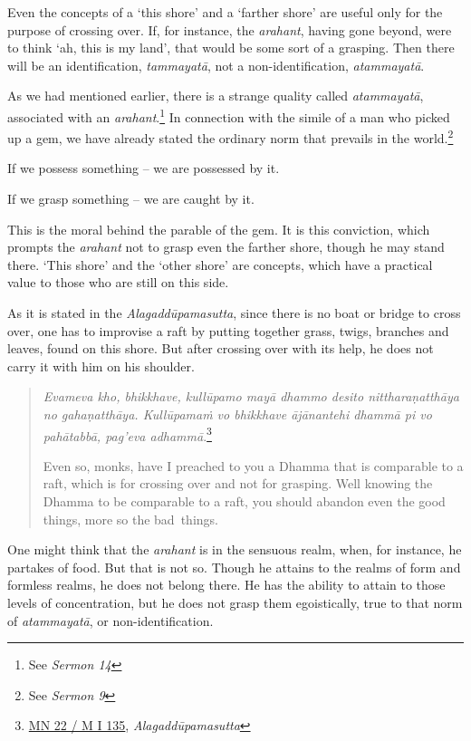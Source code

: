 Even the concepts of a `this shore' and a `farther shore' are useful only for the purpose of crossing over. If, for instance, the \emph{arahant}, having gone beyond, were to think `ah, this is my land', that would be some sort of a grasping. Then there will be an identification, \emph{tammayatā}, not a non-identification, \emph{atammayatā}.

As we had mentioned earlier, there is a strange quality called \emph{atammayatā}, associated with an \emph{arahant}.\footnote{See \emph{Sermon 14}} In connection with the simile of a man who picked up a gem, we have already stated the ordinary norm that prevails in the world.\footnote{See \emph{Sermon 9}}

If we possess something -- we are possessed by it.

If we grasp something -- we are caught by it.

This is the moral behind the parable of the gem. It is this conviction, which prompts the \emph{arahant} not to grasp even the farther shore, though he may stand there. `This shore' and the `other shore' are concepts, which have a practical value to those who are still on this side.

As it is stated in the \emph{Alagaddūpamasutta}, since there is no boat or bridge to cross over, one has to improvise a raft by putting together grass, twigs, branches and leaves, found on this shore. But after crossing over with its help, he does not carry it with him on his shoulder.

\begin{quote}
\emph{Evameva kho, bhikkhave, kullūpamo mayā dhammo desito nittharaṇatthāya no gahaṇatthāya. Kullūpamaṁ vo bhikkhave ājānantehi dhammā pi vo pahātabbā, pag'eva adhammā}.\footnote{\href{https://suttacentral.net/mn22/pli/ms}{MN 22 / M I 135}, \emph{Alagaddūpamasutta}}

Even so, monks, have I preached to you a Dhamma that is comparable to a raft, which is for crossing over and not for grasping. Well knowing the Dhamma to be comparable to a raft, you should abandon even the good things, more so the bad~things.
\end{quote}

One might think that the \emph{arahant} is in the sensuous realm, when, for instance, he partakes of food. But that is not so. Though he attains to the realms of form and formless realms, he does not belong there. He has the ability to attain to those levels of concentration, but he does not grasp them egoistically, true to that norm of \emph{atammayatā}, or non-identification.

